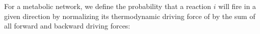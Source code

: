 For a metabolic network, we define the probability that a reaction $i$ will fire in a given direction by normalizing its thermodynamic driving force of by the sum of all forward and backward driving forces: